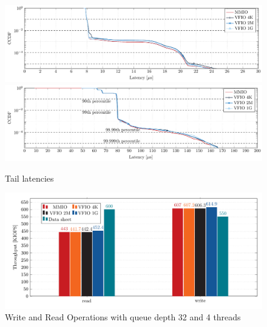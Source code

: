 \begin{figure}
    \centering
     {\includegraphics[width=\textwidth]{figures/latency_ccdf_write} \label{fig:ccdf-write}}
     {\includegraphics[width=\textwidth]{figures/latency_ccdf_read} \label{fig:ccdf-read}}
    \caption{Tail latencies}
    \label{fig:ccdf}
\end{figure}

\begin{figure}
    \centering
    \includegraphics[width=\textwidth]{figures/throughputqd32t1singlepage}
    \caption{Write and Read Operations with queue depth 32 and 4 threads}
    \label{fig:iopsq32t1sp}
\end{figure}

